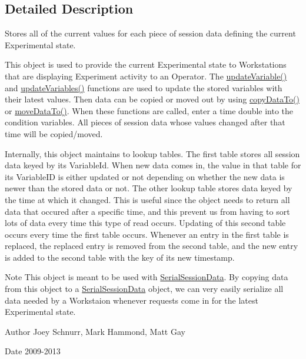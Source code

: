 \subsection{Detailed Description}
Stores all of the current values for each piece of session data defining the current Experimental state. 

This object is used to provide the current Experimental state to Workstations that are displaying Experiment activity to an Operator. The \hyperlink{class_current_session_data_a5db07b16051edc476dcf815d8c690688}{update\-Variable()} and \hyperlink{class_current_session_data_abd0e52b87a97c937baa8075ed36c05a8}{update\-Variables()} functions are used to update the stored variables with their latest values. Then data can be copied or moved out by using \hyperlink{class_session_data_a20863a2b54c30b1043ff4a87a9908ba9}{copy\-Data\-To()} or \hyperlink{class_session_data_a15c17ef02068f6ec8bf717044c21b487}{move\-Data\-To()}. When these functions are called, enter a time double into the condition variables. All pieces of session data whose values changed after that time will be copied/moved.

Internally, this object maintains to lookup tables. The first table stores all session data keyed by its Variable\-Id. When new data comes in, the value in that table for its Variable\-I\-D is either updated or not depending on whether the new data is newer than the stored data or not. The other lookup table stores data keyed by the time at which it changed. This is useful since the object needs to return all data that occured after a specific time, and this prevent us from having to sort lots of data every time this type of read occurs. Updating of this second table occurs every time the first table occurs. Whenever an entry in the first table is replaced, the replaced entry is removed from the second table, and the new entry is added to the second table with the key of its new timestamp.

\begin{DoxyNote}{Note}
This object is meant to be used with \hyperlink{class_serial_session_data}{Serial\-Session\-Data}. By copying data from this object to a \hyperlink{class_serial_session_data}{Serial\-Session\-Data} object, we can very easily serialize all data needed by a Workstaion whenever requests come in for the latest Experimental state. 
\end{DoxyNote}
\begin{DoxyAuthor}{Author}
Joey Schnurr, Mark Hammond, Matt Gay 
\end{DoxyAuthor}
\begin{DoxyDate}{Date}
2009-\/2013 
\end{DoxyDate}


